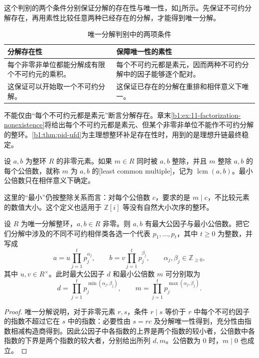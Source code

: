 这个判别的两个条件分别保证分解的存在性与唯一性，如\cref{b1:tab:ufd-two-conditions}所示。先保证不可约分解存在，再用素性比较任意两种已经存在的分解，才能得到唯一分解。
\begin{table}[H]
	\centering
	\caption{唯一分解判别中的两项条件}
	\label{b1:tab:ufd-two-conditions}
	\begin{tabularx}{\textwidth}{@{}XX@{}}
		\toprule
		分解存在性 & 保障唯一性的素性 \\
		\midrule
		每个非零非单位都能分解成有限个不可约元的乘积。 & 每个不可约元都是素元，因而两种不可约分解中的因子能够逐个配对。 \\
		这保证可以开始取一个不可约分解。 & 这保证已存在的分解在重排和相伴意义下唯一。 \\
		\bottomrule
	\end{tabularx}
\end{table}
不能仅由“每个不可约元都是素元”断言分解存在。章末\cref{b1:ex:11-factorization-nonexistence}将给出每个不可约元都是素元、但某个非零非单位不能作不可约分解的整环。\cref{b1:thm:pid-ufd}为主理想整环补足存在性时，用到的是理想升链最终稳定。

\ProseParagraphBreak

设 \(a,b\) 为整环 \(R\) 的非零元素。如果 \(m\in R\) 同时被 \(a,b\) 整除，并且 \(m\) 整除 \(a,b\) 的每个公倍数，就称 \(m\) 为 \(a,b\) 的[least common multiple]，记为 \(\operatorname{lcm}(a,b)\)。最小公倍数只在相伴意义下确定。

\ProseParagraphBreak

这里的“最小”仍按整除关系而言：对每个公倍数 \(c\)，要求的是 \(m\mid c\)，不比较元素的数值大小。这个定义也适用于 \(\mathbb Z[i]\) 等没有自然大小次序的整环。

\begin{proposition}[唯一分解整环中的最大公因子与最小公倍数]\label{b1:prop:ufd-gcd-lcm}
	设 \(R\) 为唯一分解整环，\(a,b\in R\) 非零。则 \(a,b\) 有最大公因子与最小公倍数。把它们分解中涉及的不同不可约相伴类各选一个代表 \(p_1,\ldots,p_t\)，其中 \(t\geq0\) 为整数，并写成
	\[
		a=u\prod_{j=1}^{t}p_j^{\alpha_j},\qquad b=v\prod_{j=1}^{t}p_j^{\beta_j},\qquad \alpha_j,\beta_j\in\mathbb Z_{\geq0},
	\]
	其中 \(u,v\in R^\times\)。此时最大公因子 \(d\) 和最小公倍数 \(m\) 可分别取为
	\[
		d=\prod_{j=1}^{t}p_j^{\min(\alpha_j,\beta_j)},\qquad m=\prod_{j=1}^{t}p_j^{\max(\alpha_j,\beta_j)}.
	\]
\end{proposition}
\begin{proof}
	唯一分解说明，对于非零元素 \(r,s\)，条件 \(r\mid s\) 等价于 \(r\) 中每个不可约因子的指数不超过它在 \(s\) 中的指数：必要性由 \(s=rc\) 及分解唯一性得到，充分性由指数相减构造商得到。因此公因子中各指数的上界是两个指数的较小者，公倍数中各指数的下界是两个指数的较大者，分别给出所列 \(d,m\)。公倍数为 \(0\) 时，\(m\mid0\) 也成立。
\end{proof}

